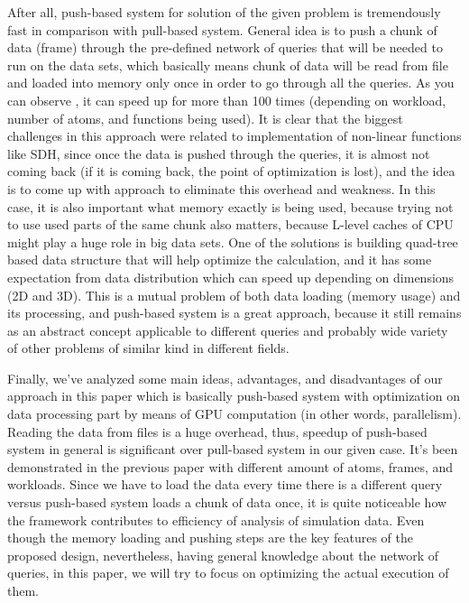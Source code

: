 \documentclass[12pt,letterpaper]{report}
\begin{document}
\noindent\hspace{3em}After all, push-based system for solution of the given problem is tremendously fast in comparison with pull-based system. General idea is to push a chunk of data (frame) through the pre-defined network of queries that will be needed to run on the data sets, which basically means chunk of data will be read from file and loaded into memory only once in order to go through all the queries. As you can observe \cite{mainPaper}, it can speed up for more than 100 times (depending on workload, number of atoms, and functions being used). It is clear that the biggest challenges in this approach were related to implementation of non-linear functions like SDH, since once the data is pushed through the queries, it is almost not coming back (if it is coming back, the point of optimization is lost), and the idea is to come up with approach to eliminate this overhead and weakness. In this case, it is also important what memory exactly is being used, because trying not to use used parts of the same chunk also matters, because L-level caches of CPU might play a huge role in big data sets. One of the solutions is building quad-tree based data structure that will help optimize the calculation, and it has some expectation from data distribution which can speed up depending on dimensions (2D and 3D). This is a mutual problem of both data loading (memory usage) and its processing, and push-based system is a great approach, because it still remains as an abstract concept applicable to different queries and probably wide variety of other problems of similar kind in different fields.

\noindent\hspace{3em}Finally, we've analyzed some main ideas, advantages, and disadvantages of our approach in this paper which is basically push-based system with optimization on data processing part by means of GPU computation (in other words, parallelism). Reading the data from files is a huge overhead, thus, speedup of push-based system in general is significant over pull-based system in our given case. 
It's been demonstrated in the previous paper with different amount of atoms, frames, and workloads. Since we have to load the data every time there is a different query versus push-based system loads a chunk of data once, it is quite noticeable how the framework contributes to efficiency of analysis of simulation data. Even though the memory loading and pushing steps are the key features of the proposed design, nevertheless, having general knowledge about the network of queries, in this paper, we will try to focus on optimizing the actual execution of them.
\end{document}
